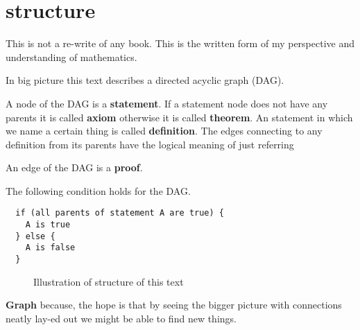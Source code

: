 \documentclass[./main.tex]{subfiles}
\begin{document}
\chapter{structure}
This is not a re-write of any book.
This is the written form of my perspective and understanding of mathematics.

In big picture this text describes a directed acyclic graph (DAG).

A node of the DAG is a \textbf{statement}.
If a statement node does not have any parents it is called \textbf{axiom} otherwise it is called \textbf{theorem}.
An statement in which we name a certain thing is called \textbf{definition}.
The edges connecting to any definition from its parents have the logical meaning of just referring

An edge of the DAG is a \textbf{proof}.

The following condition holds for the DAG.
\begin{verbatim}
  if (all parents of statement A are true) {
    A is true
  } else {
    A is false
  }
\end{verbatim}

\begin{figure}[h]
	\centering
	\caption{Illustration of structure of this text}
	\label{fig:structure_of_text}
\end{figure}

\textbf{Graph} because, the hope is that by seeing the bigger picture with connections neatly lay-ed out we might be able to find new things.
\end{document}
